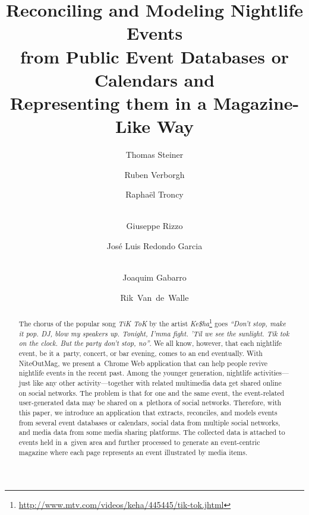 \documentclass[runningheads,a4paper]{llncs}
\begin{document}
\title{Reconciling and Modeling Nightlife Events\\ from Public Event Databases or Calendars and\\ Representing them in a Magazine-Like Way}


\author{Thomas Steiner \and
		Ruben Verborgh \and
        Rapha\"el Troncy \and\\
		Giuseppe Rizzo \and
		José Luis Redondo Garcia \and	\\
		Joaquim Gabarro \and 
		Rik~Van~de~Walle		
}


\maketitle
\setcounter{footnote}{0}

\begin{abstract}
The chorus of the popular song \emph{TiK ToK} by the artist \emph{Ke\$ha}\footnote{\url{http://www.mtv.com/videos/keha/445445/tik-tok.jhtml}} goes \emph{``Don't stop, make it pop. DJ, blow my speakers up. Tonight, I'mma fight. 'Til we see the sunlight. Tik tok on the clock. But the party don't stop, no''}. We all know, however, that each nightlife event, be it a~party, concert, or bar evening, comes to an end eventually. With NiteOutMag, we present a~Chrome Web application that can help people revive nightlife events in the recent past. Among the younger generation, nightlife activities---just like any other activity---together with related multimedia data get shared online on social networks. The problem is that for one and the same event, the event-related user-generated data may be shared on a~plethora of social networks. Therefore, with this paper, we introduce an application that extracts, reconciles, and models events from several event databases or calendars, social data from multiple social networks, and media data from some media sharing platforms. The collected data is attached to events held in a~given area and further processed to generate an event-centric magazine where each page represents an event illustrated by media items.
\end{abstract}
\end{document}

